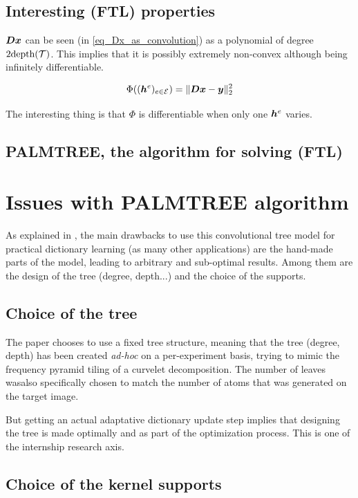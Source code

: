 \subsection{Interesting (FTL) properties}
$\bm D\bm x$ can be seen (in \cref{eq_Dx_as_convolution}) as a polynomial of degree $2\text{depth}(\mathcal T)$. This implies that it is possibly extremely non-convex although being infinitely differentiable.

$$\Phi((\bm h^e)_{e \in \mathcal E}) = \lVert \bm D\bm x-\bm y \rVert^2_2$$

The interesting thing is that $\Phi$ is differentiable when only one $\bm h^e$ varies. %


\subsection{PALMTREE, the algorithm for solving (FTL)}

\section{Issues with PALMTREE algorithm}
As explained in \cite[p. 23]{chabiron_optimization_2016}, the main drawbacks to use this convolutional tree model for practical dictionary learning (as many other applications) are the hand-made parts of the model, leading to arbitrary and sub-optimal results. Among them are the design of the tree (degree, depth...) and the choice of the supports. %
\subsection{Choice of the tree}
The paper chooses to use a fixed tree structure, meaning that the tree (degree, depth) has been created \emph{ad-hoc} on a per-experiment basis, trying to mimic the frequency pyramid tiling of a curvelet decomposition. The number of leaves wasalso specifically chosen to match the number of atoms that was generated on the target image.

But getting an actual adaptative dictionary update step implies that designing the tree is made optimally and as part of the optimization process. This is one of the internship research axis.

\subsection{Choice of the kernel supports}

